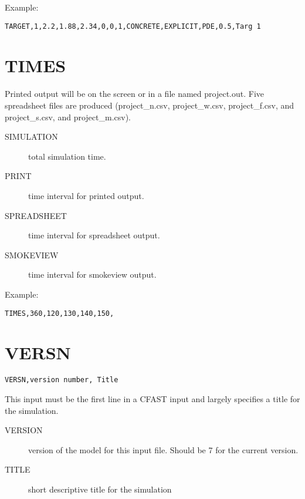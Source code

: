 \noindent Example:

\begin{lstlisting}
TARGET,1,2.2,1.88,2.34,0,0,1,CONCRETE,EXPLICIT,PDE,0.5,Targ 1
\end{lstlisting}

\section{TIMES}

Printed output will be on the screen or in a file named project.out. Five spreadsheet files are produced (project\_n.csv, project\_w.csv, project\_f.csv, and project\_s.csv, and project\_m.csv). 

\begin{adjustwidth}{1cm}{0cm}
\begin{description}
  \item[SIMULATION] total simulation time.
  \item[PRINT] time interval for printed output.
  \item[SPREADSHEET] time interval for spreadsheet output.
  \item[SMOKEVIEW] time interval for smokeview output.
\end{description}
\end{adjustwidth}

\noindent Example:

\begin{lstlisting}
TIMES,360,120,130,140,150,
\end{lstlisting}

\section{VERSN}

\begin{lstlisting}
VERSN,version number, Title
\end{lstlisting}

This input must be the first line in a CFAST input and largely specifies a title for the simulation. 

\begin{adjustwidth}{1cm}{0cm}
\begin{description}
  \item[VERSION] version of the model for this input file.  Should be 7 for the current version.
  \item[TITLE] short descriptive title for the simulation
\end{description}
\end{adjustwidth}

